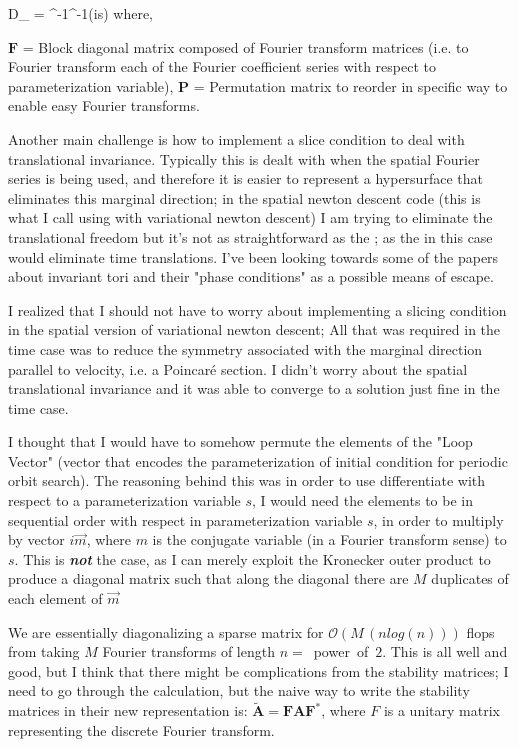 \beq \nonumber
D_{} = ^{-1}^{-1}(is) \quad
    \mbox{where,}
\label{e-FvndBAD}
\eeq

$\mathbf{F}$ = Block diagonal matrix composed of Fourier transform matrices (i.e. to Fourier transform each
of the Fourier coefficient series with respect to parameterization variable), $\mathbf{P}$ = Permutation matrix
to reorder in specific way to enable easy Fourier transforms.

Another main challenge is how to implement a slice condition to deal with translational
invariance. Typically this is dealt with when the spatial Fourier series is being used, and
therefore it is easier to represent a hypersurface that eliminates this marginal direction; in
the spatial {newton descent} code (this is what I call using  with variational
{newton descent}) I am trying to eliminate the translational freedom but it's not as straightforward as
the {\fFslice}; as the {\fFslice} in this case would eliminate time translations.
I've been looking towards some of the papers about invariant tori and their "phase conditions" as a
possible means of escape.

I realized that I should not have to worry about implementing a slicing condition
in the spatial version of variational {newton descent}; All that was required in the
time case was to reduce the symmetry associated with the marginal direction parallel to
velocity, i.e. a Poincar\'e section. I didn't worry about the spatial translational invariance
and it was able to converge to a solution just fine in the time case.

I thought that I would have to somehow permute the elements  of the "Loop Vector" (vector that
encodes the parameterization of initial condition for periodic orbit search). The reasoning behind this
was in order to use differentiate with respect to a parameterization variable $s$, I would need
the elements to be in sequential order with respect in parameterization variable $s$, in order to
multiply by vector $i \vec{m}$, where $m$ is the conjugate variable (in a Fourier transform sense)
to $s$. This is \textbf{\emph{not}}
the case, as I can merely exploit the Kronecker outer product to produce a diagonal matrix such that
along the diagonal there are $M$ duplicates of each element of $\vec{m}$

We are essentially diagonalizing a sparse matrix for $\mathcal{O}(M\,(n log(n)))$ flops
from taking $M$ Fourier transforms of length $n =$~power~of~$2$.
This is all well and good, but I think that there might be complications from the stability matrices;
I need to go through the calculation, but the naive way to write the
stability matrices in their new representation is:
 $\tilde{\mathbf{A}} = \mathbf{F} \mathbf{A} \mathbf{F^{*}}$, where $F$
is a unitary matrix representing the discrete Fourier transform.

